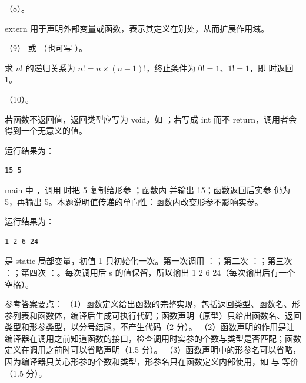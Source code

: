 \documentclass[a4paper,11pt]{article}
\begin{document}
\q （8）。\begin{analysis}extern 用于声明外部变量或函数，表示其定义在别处，从而扩展作用域。\end{analysis}

\q （9） 或 （也可写 ）。\begin{analysis}求 $n!$ 的递归关系为 $n! = n\times(n-1)!$，终止条件为 $0!=1$、$1!=1$，即  时返回 1。\end{analysis}

\q （10）。\begin{analysis}若函数不返回值，返回类型应写为 void，如 ；若写成 int 而不 return，调用者会得到一个无意义的值。\end{analysis}


\q 运行结果为：
\begin{lstlisting}
15 5
\end{lstlisting}
\begin{analysis}main 中 ，调用  时把 5 复制给形参 ；函数内  并输出 15；函数返回后实参  仍为 5，再输出 5。本题说明值传递的单向性：函数内改变形参不影响实参。\end{analysis}

\q 运行结果为：
\begin{lstlisting}
1 2 6 24
\end{lstlisting}
\begin{analysis} 是 static 局部变量，初值 1 只初始化一次。第一次调用 ：；第二次 ：；第三次 ：；第四次 ：。每次调用后 s 的值保留，所以输出 1 2 6 24（每次输出后有一个空格）。\end{analysis}


\q 参考答案要点：
（1）函数定义给出函数的完整实现，包括返回类型、函数名、形参列表和函数体，编译后生成可执行代码；函数声明（原型）只给出函数名、返回类型和形参类型，以分号结尾，不产生代码（2 分）。
（2）函数声明的作用是让编译器在调用之前知道函数的接口，检查调用时实参的个数与类型是否匹配；函数定义在调用之前时可以省略声明（1.5 分）。
（3）函数声明中的形参名可以省略，因为编译器只关心形参的个数和类型，形参名只在函数定义内部使用，如  与  等价（1.5 分）。
\end{document}
